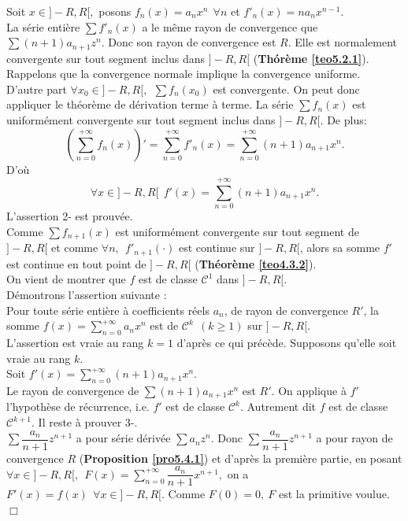\documentclass[11pt, a4paper]{book}
\newenvironment{pr}{\noindent {\bf Preuve} \noindent} {\hfill $\Box$\vskip 5mm}
\begin{document}
\begin{pr}\quad
Soit $x\in ]-R,R[,$ posons $f_n(x)=a_nx^n ~~\forall n$ et $f'_n(x)=na_nx^{n-1}.$\\
La s\'erie enti\`ere $\sum f'_n(x)$ a le m\^eme rayon de convergence que $\sum (n+1)a_{n+1}z^n$. Donc son rayon de convergence est $R$. Elle est normalement convergente sur tout segment inclus dans $]-R,R[$ (\textbf{Th\'or\`eme \ref{teo5.2.1}}). Rappelons que la convergence normale implique la convergence uniforme.\\
D'autre part $\forall x_0\in ]-R,R[,~~\sum f_n(x_0)$ est convergente. On peut donc appliquer le th\'eor\`eme de d\'erivation terme \`a terme. La s\'erie $\sum f_n(x)$ est uniform\'ement convergente sur tout segment inclus dans $]-R,R[.$ De plus: $$\left(\sum_{n=0}^{+\infty}f_n(x)\right)'=\sum_{n=0}^{+\infty}f'_n(x)=\sum_{n=0}^{+\infty}(n+1)a_{n+1}x^{n}.$$ D'o\`u $$ \forall x\in ]-R,R[~~f'(x)=\sum_{n=0}^{+\infty}(n+1)a_{n+1}x^n.$$ L'assertion 2- est prouv\'ee.\\
Comme $\sum f_{n+1}(x)$ est uniform\'ement convergente sur tout segment de $]-R,R[$ et comme $\forall n,~~f'_{n+1}(\cdot)$ est  continue sur $]-R,R[$, alors sa somme $f'$ est continue en tout point de $]-R,R[$ (\textbf{Th\'eor\`eme \ref{teo4.3.2}}).\\
On vient de montrer que $f$ est de classe $\mathcal{C}^1$ dans $]-R,R[.$\\
D\'emontrons l'assertion suivante : \\ 
Pour toute s\'erie enti\`ere \`a coefficients r\'eels $a_n$, de rayon de convergence $R'$, la somme ${\displaystyle f(x)=\sum_{n=0}^{+\infty}a_nx^n}$ est de $\mathcal{C}^k~~(k\geq1)$ sur $]-R,R[.$\\
L'assertion est vraie au rang $k=1$ d'apr\`es ce qui pr\'ec\`ede. Supposons qu'elle soit vraie au rang $k$.\\
Soit ${\displaystyle f'(x)=\sum_{n=0}^{+\infty}(n+1)a_{n+1}x^n.}$\\
Le rayon de convergence de $\sum (n+1)a_{n+1}x^n$ est $R'$. On applique \`a $f'$ l'hypoth\`ese de r\'ecurrence, i.e. $f'$ est de classe $\mathcal{C}^k.$ Autrement dit $f$ est de classe $\mathcal{C}^{k+1}.$ Il reste \`a prouver 3-.\\
$\sum \dfrac{a_n}{n+1}z^{n+1}$ a pour s\'erie d\'eriv\'ee $\sum a_nz^n.$ Donc $\sum\dfrac{a_n}{n+1}z^{n+1}$ a pour rayon de convergence $R$ (\textbf{Proposition \ref{pro5.4.1}}) et d'apr\`es la premi\`ere partie, en posant ${\displaystyle\forall x\in]-R,R[,~~F(x)=\sum_{n=0}^{+\infty}\dfrac{a_n}{n+1}x^{n+1},}$ on a $F'(x)=f(x)~~\forall x\in ]-R,R[.$ Comme $F(0)=0,~F$ est la primitive voulue.
\end{pr}
\end{document}

